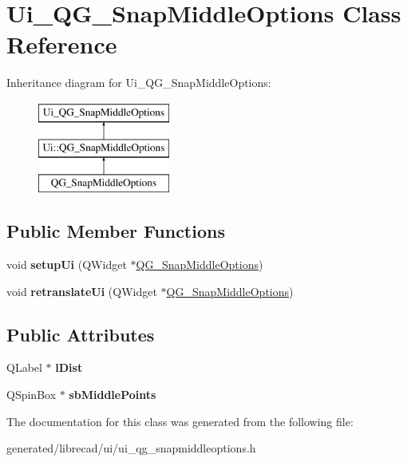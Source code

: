 \hypertarget{classUi__QG__SnapMiddleOptions}{\section{Ui\-\_\-\-Q\-G\-\_\-\-Snap\-Middle\-Options Class Reference}
\label{classUi__QG__SnapMiddleOptions}
}
Inheritance diagram for Ui\-\_\-\-Q\-G\-\_\-\-Snap\-Middle\-Options\-:\begin{figure}[H]
\begin{center}
\leavevmode
\includegraphics[height=3.000000cm]{classUi__QG__SnapMiddleOptions}
\end{center}
\end{figure}
\subsection*{Public Member Functions}
\begin{DoxyCompactItemize}
\item 
\hypertarget{classUi__QG__SnapMiddleOptions_a68b6b3b1453ce7d60d61fb00c593d7ef}{void {\bfseries setup\-Ui} (Q\-Widget $\ast$\hyperlink{classQG__SnapMiddleOptions}{Q\-G\-\_\-\-Snap\-Middle\-Options})}\label{classUi__QG__SnapMiddleOptions_a68b6b3b1453ce7d60d61fb00c593d7ef}

\item 
\hypertarget{classUi__QG__SnapMiddleOptions_a8979068ea55c97826d9d13f7b0a0d014}{void {\bfseries retranslate\-Ui} (Q\-Widget $\ast$\hyperlink{classQG__SnapMiddleOptions}{Q\-G\-\_\-\-Snap\-Middle\-Options})}\label{classUi__QG__SnapMiddleOptions_a8979068ea55c97826d9d13f7b0a0d014}

\end{DoxyCompactItemize}
\subsection*{Public Attributes}
\begin{DoxyCompactItemize}
\item 
\hypertarget{classUi__QG__SnapMiddleOptions_ab884064d0b6f5f81ecdc0687f11cbc1f}{Q\-Label $\ast$ {\bfseries l\-Dist}}\label{classUi__QG__SnapMiddleOptions_ab884064d0b6f5f81ecdc0687f11cbc1f}

\item 
\hypertarget{classUi__QG__SnapMiddleOptions_a3dcc91f3d57f83726d298a32b54c214d}{Q\-Spin\-Box $\ast$ {\bfseries sb\-Middle\-Points}}\label{classUi__QG__SnapMiddleOptions_a3dcc91f3d57f83726d298a32b54c214d}

\end{DoxyCompactItemize}


The documentation for this class was generated from the following file\-:\begin{DoxyCompactItemize}
\item 
generated/librecad/ui/ui\-\_\-qg\-\_\-snapmiddleoptions.\-h\end{DoxyCompactItemize}
